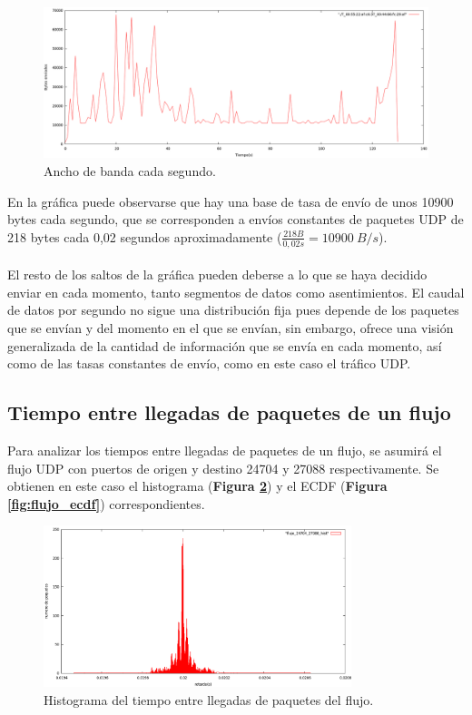 \documentclass[a4paper, 11pt]{article}	%
\begin{document}
\begin{figure}[H]
\centering
\includegraphics[width=1.0\textwidth]{throughput.png}
\caption{Ancho de banda cada segundo.}
\label{fig:throughput}
\end{figure}

En la gráfica puede observarse que hay una base de tasa de envío de unos 10900 bytes cada segundo, que se corresponden a envíos constantes de paquetes UDP de 218 bytes cada 0,02 segundos aproximadamente ($\frac{218 B}{0,02 s} = 10900\ B/s$).
\\\\
El resto de los saltos de la gráfica pueden deberse a lo que se haya decidido enviar en cada momento, tanto segmentos de datos como asentimientos. El caudal de datos por segundo no sigue una distribución fija pues depende de los paquetes que se envían y del momento en el que se envían, sin embargo, ofrece una visión generalizada de la cantidad de información que se envía en cada momento, así como de las tasas constantes de envío, como en este caso el tráfico UDP.

\subsection{Tiempo entre llegadas de paquetes de un flujo}
Para analizar los tiempos entre llegadas de paquetes de un flujo, se asumirá el flujo UDP con puertos de origen y destino 24704 y 27088 respectivamente. Se obtienen en este caso el histograma (\textbf{Figura \ref{fig:flujo_hist}}) y el ECDF (\textbf{Figura \ref{fig:flujo_ecdf}}) correspondientes.

\begin{figure}[H]
\centering
\includegraphics[width=0.8\textwidth]{flujo_hist.png}
\caption{Histograma del tiempo entre llegadas de paquetes del flujo.}
\label{fig:flujo_hist}
\end{figure}
\end{document}
